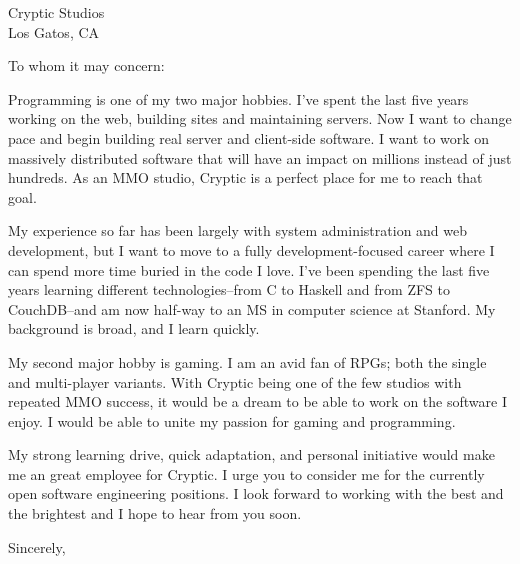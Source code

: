 \documentclass{letter}[11pt]
\begin{document}
\begin{letter}{Cryptic Studios\\
Los Gatos, CA
}

\opening{To whom it may concern:}

Programming is one of my two major hobbies.  I've spent the last five years working on the web, building sites and maintaining servers.  Now I want to change pace and begin building real server and client-side software.  I want to work on massively distributed software that will have an impact on millions instead of just hundreds.  As an MMO studio, Cryptic is a perfect place for me to reach that goal.

My experience so far has been largely with system administration and web development, but I want to move to a fully development-focused career where I can spend more time buried in the code I love.  I've been spending the last five years learning different technologies--from C to Haskell and from ZFS to CouchDB--and am now half-way to an MS in computer science at Stanford. My background is broad, and I learn quickly.

My second major hobby is gaming.  I am an avid fan of RPGs; both the single and multi-player variants.  With Cryptic being one of the few studios with repeated MMO success, it would be a dream to be able to work on the software I enjoy.  I would be able to unite my passion for gaming and programming.

My strong learning drive, quick adaptation, and personal initiative would make me an great employee for Cryptic.  I urge you to consider me for the currently open software engineering positions.  I look forward to working with the best and the brightest and I hope to hear from you soon.

\closing{Sincerely,}
\end{letter}
\end{document}
